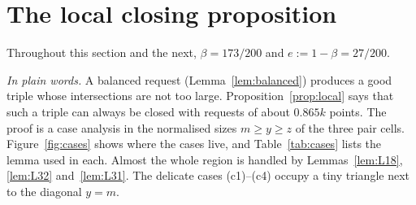 \documentclass[11pt]{amsart}
\theoremstyle{definition}
\theoremstyle{remark}
\begin{document}
\section{The local closing proposition}\label{sec:local}

Throughout this section and the next, $\beta=173/200$ and $e:=1-\beta=27/200$.

\noindent\emph{In plain words.} A balanced request (Lemma~\ref{lem:balanced}) produces a good triple whose intersections are not too large. Proposition~\ref{prop:local} says that such a triple can always be closed with requests of about $0.865k$ points. The proof is a case analysis in the normalised sizes $m\ge y\ge z$ of the three pair cells. Figure~\ref{fig:cases} shows where the cases live, and Table~\ref{tab:cases} lists the lemma used in each. Almost the whole region is handled by Lemmas~\ref{lem:L18}, \ref{lem:L32} and~\ref{lem:L31}. The delicate cases (c1)--(c4) occupy a tiny triangle next to the diagonal $y=m$.
\end{document}
